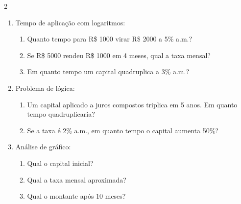 \documentclass[11pt]{article}
\begin{document}
\begin{multicols}{2}
\begin{enumerate}[leftmargin=*, start=9]
\item Tempo de aplicação com logaritmos:
\begin{enumerate}[label=\alph*)]
\item Quanto tempo para R\$ 1000 virar R\$ 2000 a 5\% a.m.?
\item Se R\$ 5000 rendeu R\$ 1000 em 4 meses, qual a taxa mensal?
\item Em quanto tempo um capital quadruplica a 3\% a.m.?
\end{enumerate}

\item Problema de lógica:
\begin{enumerate}[label=\alph*)]
\item Um capital aplicado a juros compostos triplica em 5 anos.
  Em quanto tempo quadruplicaria?
\item Se a taxa é 2\% a.m., em quanto tempo o capital aumenta 50\%?
\end{enumerate}

\item Análise de gráfico:
\begin{center}
\end{center}
\begin{enumerate}[label=\alph*)]
\item Qual o capital inicial?
\item Qual a taxa mensal aproximada?
\item Qual o montante após 10 meses?
\end{enumerate}

\end{enumerate}

\end{multicols}
\end{document}
